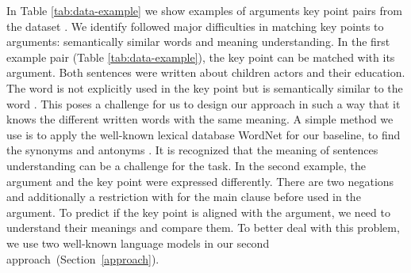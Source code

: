 In Table \ref{tab:data-example} we show examples of arguments key point pairs from the \ArgKP dataset \cite{Bar-HaimEFKLS2020}. 
We identify followed major difficulties in matching key points to arguments: semantically similar words and meaning understanding.
In the first example pair (Table \ref{tab:data-example}), the key point can be matched with its argument. Both sentences were written about children actors and their education. The word  is not explicitly used in the key point but is semantically similar to the word . 
This poses a challenge for us to design our approach in such a way that it knows the different written words with the same meaning. 
A simple method we use is to apply the well-known lexical database WordNet for our baseline, to find the synonyms and antonyms \cite{Miller1995}.
It is recognized that the meaning of sentences understanding can be a challenge for the task. In the second example, the argument and the key point were expressed differently. There are two negations  and additionally a restriction with  for the main clause before used in the argument. 
To predict if the key point is aligned with the argument, we need to understand their meanings and compare them. 
To better deal with this problem, we use two well-known language models in our second approach~(Section~\ref{approach}).

